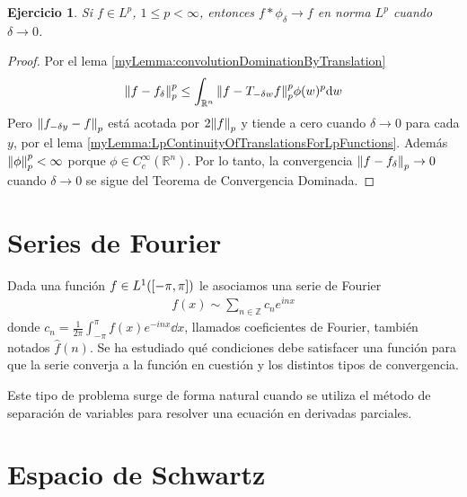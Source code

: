 \documentclass{article}
\newcommand{\integerNumbers}{\mathbb{Z}}
\newcommand{\realNumbers}{\mathbb{R}}
\newtheorem{exercise}{Ejercicio}
\newcommand{\leftOpenInterval}{\left]}
\newcommand{\rightOpenInterval}{\right[}
\newcommand{\leftClosedInterval}{\left[}
\newcommand{\rightClosedInterval}{\right]}
\newcommand{\interval}[3]{%
  \ifstrequal{#1}{oo}{%
    \leftOpenInterval #2, #3 \rightOpenInterval%
  }{%
    \ifstrequal{#1}{co}{%
      \leftClosedInterval #2, #3 \rightOpenInterval%
    }{%
      \ifstrequal{#1}{oc}{
        \leftOpenInterval #2, #3 \rightClosedInterval%
      }{%
        \ifstrequal{#1}{cc}{
          \leftClosedInterval #2, #3 \rightClosedInterval
        }{%
        }%
      }%
    }%
  }%
}
\theoremstyle{remark}
\begin{document}
  \begin{exercise}
    Si \(f \in L^p\), \(1 \leq p < \infty\), entonces \(f * \phi_{\delta} \rightarrow f\) en norma \(L^p\) cuando \(\delta \rightarrow 0\).
  \end{exercise}
  \begin{proof}
    Por el lema \ref{myLemma:convolutionDominationByTranslation}
    \begin{align}
      \norm{f - f_{\delta}}_p^p 
      \leq 
      \int_{\realNumbers^n} \norm{f - T_{- \delta w} f}_p^p \phi(w)^p \dd w
    \end{align}
    Pero \(\norm{f_{- \delta y} - f}_p\) está acotada por \(2 \norm{f}_p\) y tiende a cero cuando \(\delta \rightarrow 0\) para cada \(y\), por el lema \ref{myLemma:LpContinuityOfTranslationsForLpFunctions}.
    Además \(\norm{\phi}_p^p < \infty\) porque \(\phi \in C^{\infty}_c(\realNumbers^n)\).
    Por lo tanto, la convergencia \(\norm{f - f_{\delta}}_p \rightarrow 0\) cuando \(\delta \rightarrow 0\) se sigue del Teorema de Convergencia Dominada.
  \end{proof}

\section{Series de Fourier}

Dada una función \(f \in L^1(\interval{cc}{- \pi}{\pi})\) le asociamos una serie de Fourier
\begin{align}
  f(x)
  \sim
  \sum_{n \in \integerNumbers} c_n e^{i n x}
\end{align}
donde \(c_n = \frac{1}{2 \pi} \int_{- \pi}^{\pi} f(x) e^{- i n x} \dd x\), llamados coeficientes de Fourier, también notados \(\hat{f}(n)\).
Se ha estudiado qué condiciones debe satisfacer una función para que la serie converja a la función en cuestión y los distintos tipos de convergencia.

Este tipo de problema surge de forma natural cuando se utiliza el método de separación de variables para resolver una ecuación en derivadas parciales.


\section{Espacio de Schwartz}
\end{document}
